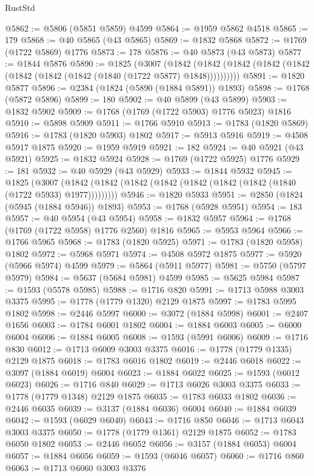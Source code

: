 \begin{lexlean}{RustStd}
\begin{coremodule}
@5862 := @5806 (@5851 @5859) @4599
@5864 := @1959 @5862 @4518
@5865 := 179
@5868 := @40 @5865 (@43 @5865)
@5869 := @1832 @5868
@5872 := @1769 (@1722 @5869) @1776
@5873 := 178
@5876 := @40 @5873 (@43 @5873)
@5877 := @1844 @5876
@5890 := @1825
    (@3007
      (@1842 (@1842 (@1842 (@1842 (@1842 (@1842 (@1842 (@1842 (@1840 (@1722 @5877) @1848))))))))))
@5891 := @1820 @5877
@5896 := @2384 (@1824 (@5890 (@1884 @5891)) @1893)
@5898 := @1768 (@5872 @5896)
@5899 := 180
@5902 := @40 @5899 (@43 @5899)
@5903 := @1832 @5902
@5909 := @1768 (@1769 (@1722 @5903) @1776 @5023) @1816
@5910 := @5898 @5909
@5911 := @1766 @5910
@5913 := @1783 (@1820 @5869)
@5916 := @1783 (@1820 @5903) @1802
@5917 := @5913 @5916
@5919 := @4508 @5917 @1875
@5920 := @1959 @5919
@5921 := 182
@5924 := @40 @5921 (@43 @5921)
@5925 := @1832 @5924
@5928 := @1769 (@1722 @5925) @1776
@5929 := 181
@5932 := @40 @5929 (@43 @5929)
@5933 := @1844 @5932
@5945 := @1825
    (@3007 (@1842 (@1842 (@1842 (@1842 (@1842 (@1842 (@1842 (@1840 (@1722 @5933) @1977)))))))))
@5946 := @1820 @5933
@5951 := @2850 (@1824 (@5945 (@1884 @5946)) @1893)
@5953 := @1768 (@5928 @5951)
@5954 := 183
@5957 := @40 @5954 (@43 @5954)
@5958 := @1832 @5957
@5964 := @1768 (@1769 (@1722 @5958) @1776 @2560) @1816
@5965 := @5953 @5964
@5966 := @1766 @5965
@5968 := @1783 (@1820 @5925)
@5971 := @1783 (@1820 @5958) @1802
@5972 := @5968 @5971
@5974 := @4508 @5972 @1875
@5977 := @5920 (@5966 @5974) @4599
@5979 := @5864 (@5911 @5977)
@5981 := @5750 (@5797 @5979)
@5984 := @5637 (@5684 @5981) @4599
@5985 := @5625 @5984
@5987 := @1593 (@5578 @5985)
@5988 := @1716 @820
@5991 := @1713 @5988 @3003 @3375
@5995 := @1778 (@1779 @1320) @2129 @1875
@5997 := @1783 @5995 @1802
@5998 := @2446 @5997
@6000 := @3072 (@1884 @5998)
@6001 := @2407 @1656
@6003 := @1784 @6001 @1802
@6004 := @1884 @6003
@6005 := @6000 @6004
@6006 := @1884 @6005
@6008 := @1593 (@5991 @6006)
@6009 := @1716 @830
@6012 := @1713 @6009 @3003 @3375
@6016 := @1778 (@1779 @1335) @2129 @1875
@6018 := @1783 @6016 @1802
@6019 := @2446 @6018
@6022 := @3097 (@1884 @6019) @6004
@6023 := @1884 @6022
@6025 := @1593 (@6012 @6023)
@6026 := @1716 @840
@6029 := @1713 @6026 @3003 @3375
@6033 := @1778 (@1779 @1348) @2129 @1875
@6035 := @1783 @6033 @1802
@6036 := @2446 @6035
@6039 := @3137 (@1884 @6036) @6004
@6040 := @1884 @6039
@6042 := @1593 (@6029 @6040)
@6043 := @1716 @850
@6046 := @1713 @6043 @3003 @3375
@6050 := @1778 (@1779 @1361) @2129 @1875
@6052 := @1783 @6050 @1802
@6053 := @2446 @6052
@6056 := @3157 (@1884 @6053) @6004
@6057 := @1884 @6056
@6059 := @1593 (@6046 @6057)
@6060 := @1716 @860
@6063 := @1713 @6060 @3003 @3376

\end{coremodule}
\end{lexlean}
